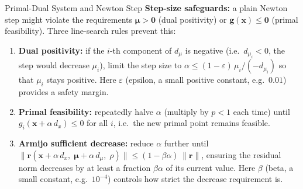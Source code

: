 \documentclass[aspectratio=169,10pt]{beamer}
\newcommand{\bx}{\mathbf{x}}
\newcommand{\bg}{\mathbf{g}}
\newcommand{\bmu}{\boldsymbol{\mu}}
\begin{document}
\begin{frame}[allowframebreaks]{Primal-Dual System and Newton Step}
  \textbf{Step-size safeguards:} a plain Newton step might violate the
  requirements $\bmu > \mathbf{0}$ (dual positivity) or
  $\bg(\bx) \le \mathbf{0}$ (primal feasibility).  Three line-search
  rules prevent this:

  \begin{enumerate}
    \item \textbf{Dual positivity:} if the $i$-th component of $d_\mu$ is
          negative (i.e.\ $d_{\mu_i} < 0$, the step would decrease $\mu_i$),
          limit the step size to
          $\alpha \le (1 - \varepsilon)\,\mu_i / (-d_{\mu_i})$
          so that $\mu_i$ stays positive.  Here $\varepsilon$ (epsilon,
          a small positive constant, e.g.\ $0.01$) provides a safety margin.
    \item \textbf{Primal feasibility:} repeatedly halve $\alpha$ (multiply
          by $p < 1$ each time) until $g_i(\bx + \alpha\, d_x) \le 0$ for
          all $i$, i.e.\ the new primal point remains feasible.
    \item \textbf{Armijo sufficient decrease:} reduce $\alpha$ further until
          $\|\mathbf{r}(\bx + \alpha\, d_x,\; \bmu + \alpha\, d_\mu,\; \rho)\|
           \le (1 - \beta\alpha)\,\|\mathbf{r}\|$,
          ensuring the residual norm decreases by at least a fraction
          $\beta\alpha$ of its current value.  Here $\beta$ (beta, a small
          constant, e.g.\ $10^{-4}$) controls how strict the decrease
          requirement is.
  \end{enumerate}

\end{frame}
\end{document}
